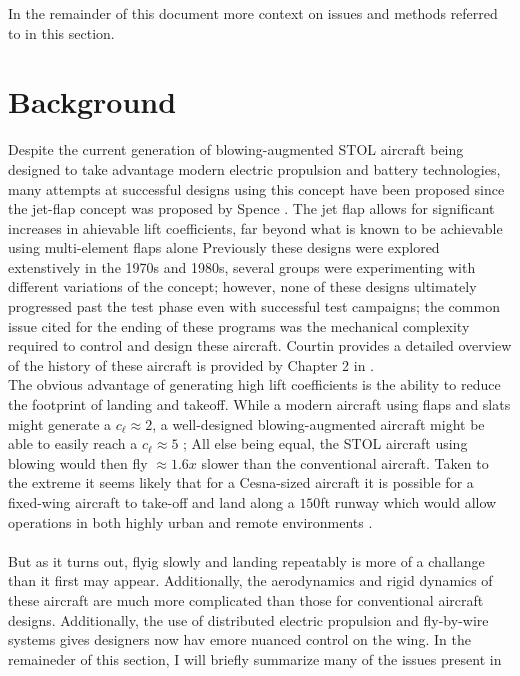 \documentclass[]{article}
\begin{document}
	In the remainder of this document more context on issues and methods referred to in this section.
	\newpage 
	
	\section{Background} \label{sec:problem-statement}
	
	Despite the current generation of blowing-augmented STOL aircraft being designed to take advantage modern electric propulsion and battery technologies, many attempts at successful designs using this concept have been proposed since the jet-flap concept was proposed by Spence \cite{spence_lift_1958}. 
	The jet flap allows for significant increases in ahievable lift coefficients, far beyond what is known to be achievable using multi-element flaps alone \cite{smith-high-lift,long_experimental_nodate,long_parametric_2021}
	Previously these designs were explored extenstively in the 1970s and 1980s, several groups were experimenting with different variations of the concept; however, none of these designs ultimately progressed past the test phase even with successful test campaigns; the common issue cited for the ending of these programs was the mechanical complexity required to control and design these aircraft. Courtin provides a detailed overview of the history of these aircraft is provided by Chapter 2 in \cite{courtin_performance_nodate}.
	\\
	The obvious advantage of generating high lift coefficients is the ability to reduce the footprint of landing and takeoff. While a modern aircraft using flaps and slats might generate a $c_\ell \approx 2$, a well-designed blowing-augmented aircraft might be able to easily reach a $c_\ell \approx 5$ \cite{smith-high-lift,long_experimental_nodate}; All else being equal, the STOL aircraft using blowing would then fly $\approx 1.6x$ slower than the conventional aircraft. Taken to the extreme it seems likely that for a Cesna-sized aircraft it is possible for a fixed-wing aircraft to take-off and land along a $150$ft runway which would allow operations in both highly urban and remote environments \cite{courtin_performance_nodate}.\\
	\\
	But as it turns out, flyig slowly and landing repeatably is more of a challange than it first may appear. 
	Additionally, the aerodynamics and rigid dynamics of these aircraft are much more complicated than those for conventional aircraft designs. 
	Additionally, the use of distributed electric propulsion and fly-by-wire systems gives designers now hav emore nuanced control on the wing. 
	In the remaineder of this section, I will briefly summarize many of the issues present in 
	
	
	
	
	
	
	
	
	
\end{document}
